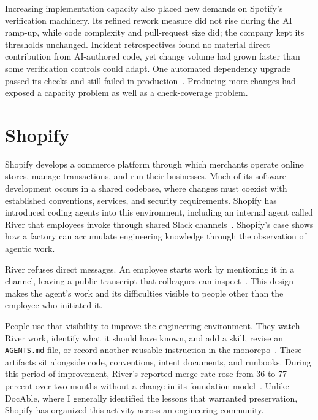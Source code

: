 Increasing implementation capacity also placed new demands on Spotify's verification machinery. Its refined rework measure did not rise during the AI ramp-up, while code complexity and pull-request size did; the company kept its thresholds unchanged. Incident retrospectives found no material direct contribution from AI-authored code, yet change volume had grown faster than some verification controls could adapt. One automated dependency upgrade passed its checks and still failed in production~\citep{singer2026quality}. Producing more changes had exposed a capacity problem as well as a check-coverage problem.

\section{Shopify}\label{heading:shopify}

Shopify develops a commerce platform through which merchants operate online stores, manage transactions, and run their businesses. Much of its software development occurs in a shared codebase, where changes must coexist with established conventions, services, and security requirements. Shopify has introduced coding agents into this environment, including an internal agent called River that employees invoke through shared Slack channels~\citep{moreno2026river}. Shopify's case shows how a factory can accumulate engineering knowledge through the observation of agentic work.


River refuses direct messages. An employee starts work by mentioning it in a channel, leaving a public transcript that colleagues can inspect~\citep{moreno2026river}. This design makes the agent's work and its difficulties visible to people other than the employee who initiated it.


People use that visibility to improve the engineering environment. They watch River work, identify what it should have known, and add a skill, revise an \texttt{AGENTS.md} file, or record another reusable instruction in the monorepo~\citep{moreno2026river}. These artifacts sit alongside code, conventions, intent documents, and runbooks. During this period of improvement, River's reported merge rate rose from 36 to 77 percent over two months without a change in its foundation model~\citep{lutke2026shopfloor}. Unlike DocAble, where I generally identified the lessons that warranted preservation, Shopify has organized this activity across an engineering community.


